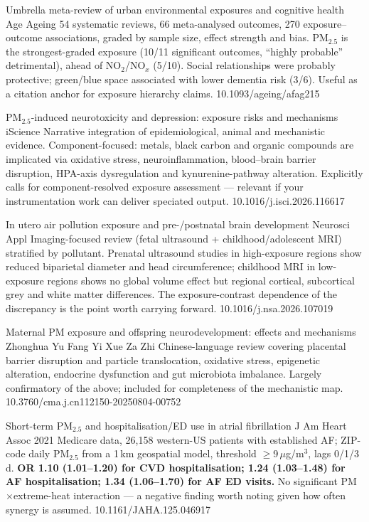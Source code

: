 \documentclass[10pt]{article}
\begin{document}
{Umbrella meta-review of urban environmental exposures and cognitive health}
{Age Ageing}
{54 systematic reviews, 66 meta-analysed outcomes, 270 exposure--outcome associations,
graded by sample size, effect strength and bias. PM$_{2.5}$ is the strongest-graded
exposure (10/11 significant outcomes, ``highly probable'' detrimental), ahead of
NO$_2$/NO$_x$ (5/10). Social relationships were probably protective; green/blue space
associated with lower dementia risk (3/6). Useful as a citation anchor for exposure
hierarchy claims.}
{10.1093/ageing/afag215}

{PM$_{2.5}$-induced neurotoxicity and depression: exposure risks and mechanisms}
{iScience}
{Narrative integration of epidemiological, animal and mechanistic evidence.
Component-focused: metals, black carbon and organic compounds are implicated via
oxidative stress, neuroinflammation, blood--brain barrier disruption, HPA-axis
dysregulation and kynurenine-pathway alteration. Explicitly calls for
component-resolved exposure assessment --- relevant if your instrumentation work can
deliver speciated output.}
{10.1016/j.isci.2026.116617}

{In utero air pollution exposure and pre-/postnatal brain development}
{Neurosci Appl}
{Imaging-focused review (fetal ultrasound + childhood/adolescent MRI) stratified by
pollutant. Prenatal ultrasound studies in high-exposure regions show reduced biparietal
diameter and head circumference; childhood MRI in low-exposure regions shows no global
volume effect but regional cortical, subcortical grey and white matter differences.
The exposure-contrast dependence of the discrepancy is the point worth carrying forward.}
{10.1016/j.nsa.2026.107019}

{Maternal PM exposure and offspring neurodevelopment: effects and mechanisms}
{Zhonghua Yu Fang Yi Xue Za Zhi}
{Chinese-language review covering placental barrier disruption and particle
translocation, oxidative stress, epigenetic alteration, endocrine dysfunction and gut
microbiota imbalance. Largely confirmatory of the above; included for completeness of
the mechanistic map.}
{10.3760/cma.j.cn112150-20250804-00752}


{Short-term PM$_{2.5}$ and hospitalisation/ED use in atrial fibrillation}
{J Am Heart Assoc}
{2021 Medicare data, 26{,}158 western-US patients with established AF; ZIP-code daily
PM$_{2.5}$ from a 1\,km geospatial model, threshold $\geq$9\,$\mu$g/m$^3$, lags 0/1/3\,d.
\textbf{OR 1.10 (1.01--1.20) for CVD hospitalisation; 1.24 (1.03--1.48) for AF
hospitalisation; 1.34 (1.06--1.70) for AF ED visits.} No significant PM$\times$extreme-heat
interaction --- a negative finding worth noting given how often synergy is assumed.}
{10.1161/JAHA.125.046917}
\end{document}

